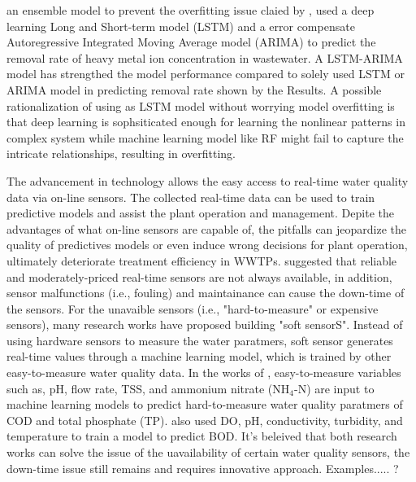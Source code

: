 an ensemble model to prevent the overfitting issue claied by \citet{zaghloulDevelopmentEnsembleMachine2021}, \citet{zaghloulDevelopmentEnsembleMachine2021} used a deep learning Long and Short-term model (LSTM) and a error compensate Autoregressive Integrated Moving Average model (ARIMA) to predict the removal rate of heavy metal ion concentration in wastewater. A LSTM-ARIMA model has strengthed the model performance compared to solely used LSTM or ARIMA model in predicting removal rate shown by the Results. A possible rationalization of using as LSTM model without worrying model overfitting is that deep learning is sophsiticated enough for learning the nonlinear patterns in complex system while machine learning model like RF might fail to capture the intricate relationships, resulting in overfitting.

The advancement in technology allows the easy access to real-time water quality data via on-line sensors. The collected real-time data can be used to train predictive models and assist the plant operation and management. Depite the advantages of what on-line sensors are capable of, the pitfalls can jeopardize the quality of predictives models or even induce wrong decisions for plant operation, ultimately deteriorate treatment efficiency in WWTPs. \citet{haimiShallWeUse2015} suggested that reliable and moderately-priced real-time sensors are not always available, in addition, sensor malfunctions (i.e., fouling) and maintainance can cause the down-time of the sensors. For the unavaible sensors (i.e., "hard-to-measure" or expensive sensors), many research works have proposed building "soft sensorS". Instead of using hardware sensors to measure the water paratmers, soft sensor generates real-time values through a machine learning model, which is trained by other easy-to-measure water quality data. In the works of \citet{wangExplicitInterpretableNonlinear2019}, easy-to-measure variables such as, pH, flow rate, TSS, and ammonium nitrate (NH$_4$-N) are input to machine learning models to predict hard-to-measure water quality paratmers of COD and total phosphate (TP). \citet{pattnaikMachineLearningBased2021} also used DO, pH, conductivity, turbidity, and temperature to train a model to predict BOD. It's beleived that both research works can solve the issue of the uavailability of certain water quality sensors, the down-time issue still remains and requires innovative approach. Examples..... ?



